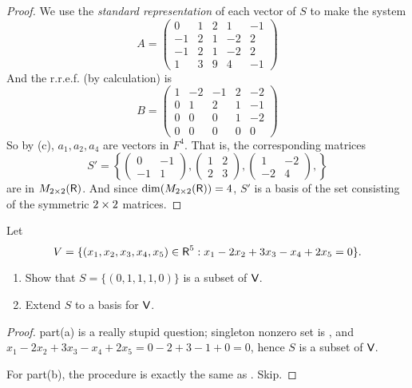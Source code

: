 \begin{proof}
We use the \emph{standard representation} of each vector of \(S\) to make the system
\[
    A = \left(\begin{array}{ccccc}
        0 & 1 & 2 & 1 & -1 \\
        -1 & 2 & 1 & -2 & 2 \\
        -1 & 2 & 1 & -2 & 2 \\
        1 & 3 & 9 & 4 & -1
    \end{array}\right)
\]
And the r.r.e.f. (by calculation) is
\[
    B = \left(\begin{array}{ccccc}
        1 & -2 & -1 & 2 & -2 \\
        0 & 1 & 2 & 1 & -1 \\
        0 & 0 & 0 & 1 & -2 \\
        0 & 0 & 0 & 0 & 0
    \end{array}\right)
\]
So by (c), \(a_1, a_2, a_4\) are \emph{\LID{}} vectors in \(F^4\).
That is, the corresponding matrices
\[
    S' = \left\{
        \left(\begin{array}{rr}
            0 & -1 \\
            -1 & 1
        \end{array}\right),
        \left(\begin{array}{ll}
            1 & 2 \\
            2 & 3
        \end{array}\right),
        \left(\begin{array}{rr}
            1 & -2 \\
            -2 & 4
        \end{array}\right),
    \right\}
\]
are \LID{} in \(M_{2 \times 2}(\textsf{R})\).
And since \(\dim(M_{2 \times 2}(\textsf{R})) = 4\), \(S'\) is a basis of the set consisting of the symmetric \(2 \times 2\) matrices.
\end{proof}

\begin{exercise} \label{exercise 3.4.10}
Let
\[
    V = \{(x_1, x_2, x_3, x_4, x_5) \in \textsf{R}^5 : x_1 - 2x_2 + 3x_3 - x_4 + 2x_5 = 0
 \}.
\]
\begin{enumerate}
\item Show that \(S = \{(0, 1, 1, 1, 0)\}\) is a \LID{} subset of \(\textsf{V}\).
\item Extend \(S\) to a basis for \(\textsf{V}\).
\end{enumerate}
\end{exercise}

\begin{proof}
part(a) is a really stupid question; singleton nonzero set is \LID{}, and \(x_1 - 2x_2 + 3x_3 - x_4 + 2x_5 = 0 - 2 + 3 - 1 + 0 = 0\), hence \(S\) is a \LID{} subset of \(\textsf{V}\).

For part(b), the procedure is exactly the same as . Skip.
\end{proof}

